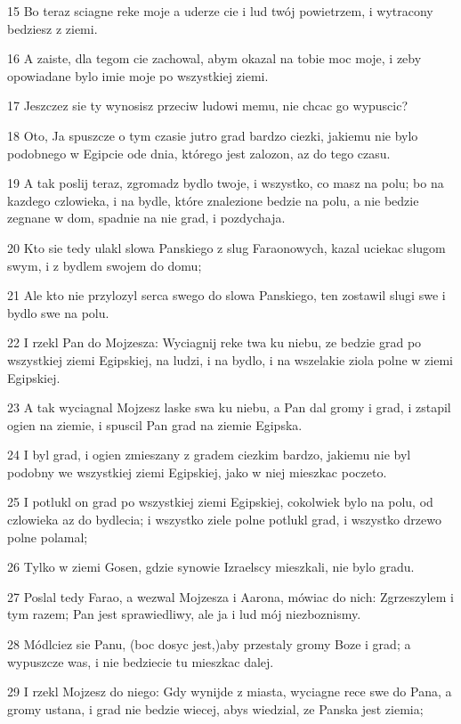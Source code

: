\par 15 Bo teraz sciagne reke moje a uderze cie i lud twój powietrzem, i wytracony bedziesz z ziemi.
\par 16 A zaiste, dla tegom cie zachowal, abym okazal na tobie moc moje, i zeby opowiadane bylo imie moje po wszystkiej ziemi.
\par 17 Jeszczez sie ty wynosisz przeciw ludowi memu, nie chcac go wypuscic?
\par 18 Oto, Ja spuszcze o tym czasie jutro grad bardzo ciezki, jakiemu nie bylo podobnego w Egipcie ode dnia, którego jest zalozon, az do tego czasu.
\par 19 A tak poslij teraz, zgromadz bydlo twoje, i wszystko, co masz na polu; bo na kazdego czlowieka, i na bydle, które znalezione bedzie na polu, a nie bedzie zegnane w dom, spadnie na nie grad, i pozdychaja.
\par 20 Kto sie tedy ulakl slowa Panskiego z slug Faraonowych, kazal uciekac slugom swym, i z bydlem swojem do domu;
\par 21 Ale kto nie przylozyl serca swego do slowa Panskiego, ten zostawil slugi swe i bydlo swe na polu.
\par 22 I rzekl Pan do Mojzesza: Wyciagnij reke twa ku niebu, ze bedzie grad po wszystkiej ziemi Egipskiej, na ludzi, i na bydlo, i na wszelakie ziola polne w ziemi Egipskiej.
\par 23 A tak wyciagnal Mojzesz laske swa ku niebu, a Pan dal gromy i grad, i zstapil ogien na ziemie, i spuscil Pan grad na ziemie Egipska.
\par 24 I byl grad, i ogien zmieszany z gradem ciezkim bardzo, jakiemu nie byl podobny we wszystkiej ziemi Egipskiej, jako w niej mieszkac poczeto.
\par 25 I potlukl on grad po wszystkiej ziemi Egipskiej, cokolwiek bylo na polu, od czlowieka az do bydlecia; i wszystko ziele polne potlukl grad, i wszystko drzewo polne polamal;
\par 26 Tylko w ziemi Gosen, gdzie synowie Izraelscy mieszkali, nie bylo gradu.
\par 27 Poslal tedy Farao, a wezwal Mojzesza i Aarona, mówiac do nich: Zgrzeszylem i tym razem; Pan jest sprawiedliwy, ale ja i lud mój niezboznismy.
\par 28 Módlciez sie Panu, (boc dosyc jest,)aby przestaly gromy Boze i grad; a wypuszcze was, i nie bedziecie tu mieszkac dalej.
\par 29 I rzekl Mojzesz do niego: Gdy wynijde z miasta, wyciagne rece swe do Pana, a gromy ustana, i grad nie bedzie wiecej, abys wiedzial, ze Panska jest ziemia;
